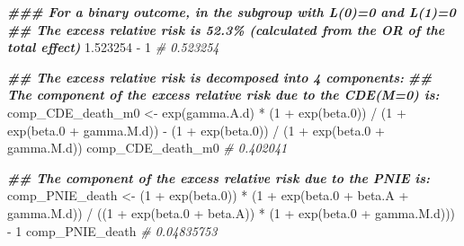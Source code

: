 \documentclass[
]{book}
\newenvironment{Shaded}{\begin{snugshade}}{\end{snugshade}}
\newcommand{\CommentTok}[1]{\textcolor[rgb]{0.56,0.35,0.01}{\textit{#1}}}
\newcommand{\DecValTok}[1]{\textcolor[rgb]{0.00,0.00,0.81}{#1}}
\newcommand{\DocumentationTok}[1]{\textcolor[rgb]{0.56,0.35,0.01}{\textbf{\textit{#1}}}}
\newcommand{\FloatTok}[1]{\textcolor[rgb]{0.00,0.00,0.81}{#1}}
\newcommand{\FunctionTok}[1]{\textcolor[rgb]{0.00,0.00,0.00}{#1}}
\newcommand{\NormalTok}[1]{#1}
\newcommand{\OtherTok}[1]{\textcolor[rgb]{0.56,0.35,0.01}{#1}}
\newcommand{\SpecialCharTok}[1]{\textcolor[rgb]{0.00,0.00,0.00}{#1}}
\begin{document}
\begin{Shaded}
\begin{Highlighting}[]
\DocumentationTok{\#\#\# For a binary outcome, in the subgroup with L(0)=0 and L(1)=0}
\DocumentationTok{\#\# The excess relative risk is 52.3\% (calculated from the OR of the total effect)}
\FloatTok{1.523254} \SpecialCharTok{{-}} \DecValTok{1}
\CommentTok{\# 0.523254}

\DocumentationTok{\#\# The excess relative risk is decomposed into 4 components:}
\DocumentationTok{\#\# The component of the excess relative risk due to the CDE(M=0) is:}
\NormalTok{comp\_CDE\_death\_m0 }\OtherTok{\textless{}{-}} \FunctionTok{exp}\NormalTok{(gamma.A.d) }\SpecialCharTok{*}\NormalTok{ (}\DecValTok{1} \SpecialCharTok{+} \FunctionTok{exp}\NormalTok{(beta}\FloatTok{.0}\NormalTok{)) }\SpecialCharTok{/}
\NormalTok{  (}\DecValTok{1} \SpecialCharTok{+} \FunctionTok{exp}\NormalTok{(beta}\FloatTok{.0} \SpecialCharTok{+}\NormalTok{ gamma.M.d)) }\SpecialCharTok{{-}}
\NormalTok{  (}\DecValTok{1} \SpecialCharTok{+} \FunctionTok{exp}\NormalTok{(beta}\FloatTok{.0}\NormalTok{)) }\SpecialCharTok{/}\NormalTok{ (}\DecValTok{1} \SpecialCharTok{+} \FunctionTok{exp}\NormalTok{(beta}\FloatTok{.0} \SpecialCharTok{+}\NormalTok{ gamma.M.d))}
\NormalTok{comp\_CDE\_death\_m0}
\CommentTok{\# 0.402041}

\DocumentationTok{\#\# The component of the excess relative risk due to the PNIE is:}
\NormalTok{comp\_PNIE\_death }\OtherTok{\textless{}{-}}\NormalTok{ (}\DecValTok{1} \SpecialCharTok{+} \FunctionTok{exp}\NormalTok{(beta}\FloatTok{.0}\NormalTok{)) }\SpecialCharTok{*}\NormalTok{ (}\DecValTok{1} \SpecialCharTok{+} \FunctionTok{exp}\NormalTok{(beta}\FloatTok{.0} \SpecialCharTok{+}\NormalTok{ beta.A }\SpecialCharTok{+}\NormalTok{ gamma.M.d)) }\SpecialCharTok{/}
\NormalTok{  ((}\DecValTok{1} \SpecialCharTok{+} \FunctionTok{exp}\NormalTok{(beta}\FloatTok{.0} \SpecialCharTok{+}\NormalTok{ beta.A)) }\SpecialCharTok{*}\NormalTok{ (}\DecValTok{1} \SpecialCharTok{+} \FunctionTok{exp}\NormalTok{(beta}\FloatTok{.0} \SpecialCharTok{+}\NormalTok{ gamma.M.d))) }\SpecialCharTok{{-}} \DecValTok{1}
\NormalTok{comp\_PNIE\_death}
\CommentTok{\# 0.04835753}


\end{Highlighting}
\end{Shaded}
\end{document}
